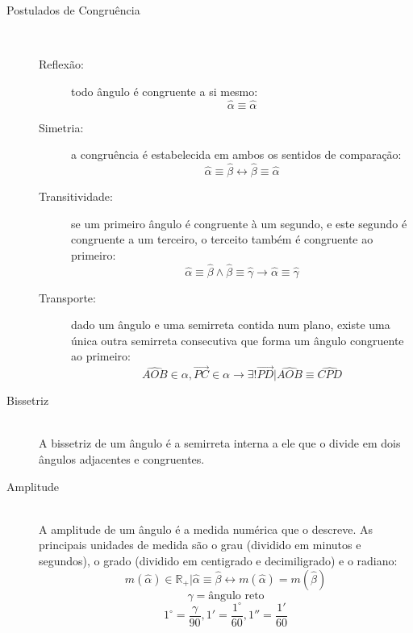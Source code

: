 \begin{description}
\begin{center}
                \end{center}
            \item[Postulados de Congruência] \hfill \\
                \begin{description}
                    \item[Reflexão:] todo ângulo é congruente a si mesmo:
                        \[ \hat{\alpha} \equiv \hat{\alpha} \]
                    \item[Simetria:] a congruência é estabelecida em ambos os sentidos de comparação:
                        \[ \hat{\alpha} \equiv \hat{\beta} \leftrightarrow \hat{\beta} \equiv \hat{\alpha} \]
                    \item[Transitividade:] se um primeiro ângulo é congruente à um segundo, e este segundo é congruente a um terceiro, o terceito também é congruente ao primeiro:
                        \[ \hat{\alpha} \equiv \hat{\beta} \wedge \hat{\beta} \equiv \hat{\gamma} \rightarrow \hat{\alpha} \equiv \hat{\gamma} \]
                    \item[Transporte:] dado um ângulo e uma semirreta contida num plano, existe uma única outra semirreta consecutiva que forma um ângulo congruente ao primeiro:
                        \[ \hat{AOB} \in \alpha , \overrightarrow{PC} \in \alpha \rightarrow \exists ! \overrightarrow{PD} | \hat{AOB} \equiv \hat{CPD} \]
                \end{description}
            \item[Bissetriz] \hfill \\
                A bissetriz de um ângulo é a semirreta interna a ele que o divide em dois ângulos adjacentes e congruentes.
            \item[Amplitude] \hfill \\
                A amplitude de um ângulo é a medida numérica que o descreve. As principais unidades de medida são o grau (dividido em minutos e segundos), o grado (dividido em centigrado e decimiligrado) e o radiano:
                \[ m(\hat{\alpha}) \in \mathbb{R}_{+} | \hat{\alpha} \equiv \hat{\beta} \leftrightarrow m(\hat{\alpha}) = m(\hat{\beta}) \]
                \[ \gamma = \text{ângulo reto} \]
                \[ 1^{\circ} = \frac{\gamma}{90}, 1' = \frac{1^{\circ}}{60}, 1'' = \frac{1'}{60} \]

\end{description}
